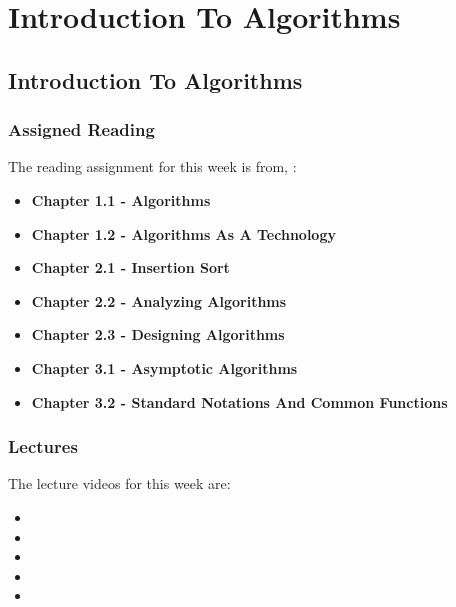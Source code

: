 \clearpage

\newcommand{\ChapTitle}{Introduction To Algorithms}
\newcommand{\SectionTitle}{Introduction To Algorithms}
\chapter{\ChapTitle}

\section{\SectionTitle}

\subsection{Assigned Reading}

The reading assignment for this week is from, \Textbook:

\begin{itemize}
    \item \textbf{Chapter 1.1 - Algorithms}
    \item \textbf{Chapter 1.2 - Algorithms As A Technology}
    \item \textbf{Chapter 2.1 - Insertion Sort}
    \item \textbf{Chapter 2.2 - Analyzing Algorithms}
    \item \textbf{Chapter 2.3 - Designing Algorithms}
    \item \textbf{Chapter 3.1 - Asymptotic Algorithms}
    \item \textbf{Chapter 3.2 - Standard Notations And Common Functions}
\end{itemize}

\subsection{Lectures}

The lecture videos for this week are:

\begin{itemize}
    \item {}
    \item {}
    \item {}
    \item {}
    \item {}
\end{itemize}

